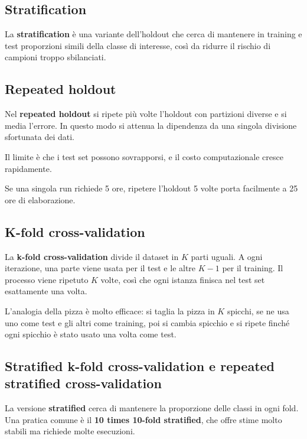 \subsection{Stratification}

La \textbf{stratification} è una variante dell'holdout che cerca di mantenere in training e test proporzioni simili della classe di interesse, così da ridurre il rischio di campioni troppo sbilanciati.

\subsection{Repeated holdout}

Nel \textbf{repeated holdout} si ripete più volte l'holdout con partizioni diverse e si media l'errore. In questo modo si attenua la dipendenza da una singola divisione sfortunata dei dati.

Il limite è che i test set possono sovrapporsi, e il costo computazionale cresce rapidamente.

\begin{notaprof}
Se una singola run richiede 5 ore, ripetere l'holdout 5 volte porta facilmente a 25 ore di elaborazione.
\end{notaprof}

\subsection{K-fold cross-validation}

La \textbf{k-fold cross-validation} divide il dataset in \(K\) parti uguali. A ogni iterazione, una parte viene usata per il test e le altre \(K-1\) per il training. Il processo viene ripetuto \(K\) volte, così che ogni istanza finisca nel test set esattamente una volta.

\begin{notaprof}
L'analogia della pizza è molto efficace: si taglia la pizza in \(K\) spicchi, se ne usa uno come test e gli altri come training, poi si cambia spicchio e si ripete finché ogni spicchio è stato usato una volta come test.
\end{notaprof}

\subsection{Stratified k-fold cross-validation e repeated stratified cross-validation}

La versione \textbf{stratified} cerca di mantenere la proporzione delle classi in ogni fold. Una pratica comune è il \textbf{10 times 10-fold stratified}, che offre stime molto stabili ma richiede molte esecuzioni.

